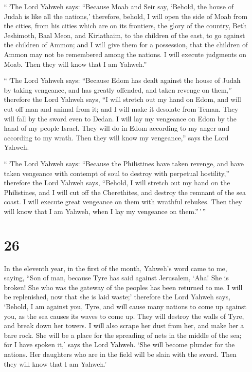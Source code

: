  ``\,`The Lord Yahweh says: ``Because Moab and Seir say,
`Behold, the house of Judah is like all the nations,' 
therefore, behold, I will open the side of Moab from the cities, from
his cities which are on its frontiers, the glory of the country, Beth
Jeshimoth, Baal Meon, and Kiriathaim,  to the children of
the east, to go against the children of Ammon; and I will give them for
a possession, that the children of Ammon may not be remembered among the
nations.  I will execute judgments on Moab. Then they
will know that I am Yahweh.''

 ``\,`The Lord Yahweh says: ``Because Edom has dealt
against the house of Judah by taking vengeance, and has greatly
offended, and taken revenge on them,''  therefore the
Lord Yahweh says, ``I will stretch out my hand on Edom, and will cut off
man and animal from it; and I will make it desolate from Teman. They
will fall by the sword even to Dedan.  I will lay my
vengeance on Edom by the hand of my people Israel. They will do in Edom
according to my anger and according to my wrath. Then they will know my
vengeance,'' says the Lord Yahweh.

 ``\,`The Lord Yahweh says: ``Because the Philistines
have taken revenge, and have taken vengeance with contempt of soul to
destroy with perpetual hostility,''  therefore the Lord
Yahweh says, ``Behold, I will stretch out my hand on the Philistines,
and I will cut off the Cherethites, and destroy the remnant of the sea
coast.  I will execute great vengeance on them with
wrathful rebukes. Then they will know that I am Yahweh, when I lay my
vengeance on them.''\,'\,''

\hypertarget{section-25}{%
\section{26}\label{section-25}}

 In the eleventh year, in the first of the month, Yahweh's
word came to me, saying,  ``Son of man, because Tyre has
said against Jerusalem, `Aha! She is broken! She who was the gateway of
the peoples has been returned to me. I will be replenished, now that she
is laid waste;'  therefore the Lord Yahweh says, `Behold,
I am against you, Tyre, and will cause many nations to come up against
you, as the sea causes its waves to come up.  They will
destroy the walls of Tyre, and break down her towers. I will also scrape
her dust from her, and make her a bare rock.  She will be
a place for the spreading of nets in the middle of the sea; for I have
spoken it,' says the Lord Yahweh. `She will become plunder for the
nations.  Her daughters who are in the field will be slain
with the sword. Then they will know that I am Yahweh.'


